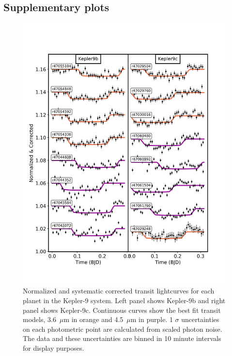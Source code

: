 \begin{subappendices}

\section{Supplementary plots}
\label{P4:app:plots}


\begin{figure}
  \includegraphics[trim={0 2cm 0 0},clip,width=\textwidth]{CorrectedLighctuvesPLDKepler9_circ_fixaincrp_new.pdf}
  \caption{Normalized and systematic corrected transit lightcurves for each planet in the Kepler-9 system. Left panel shows Kepler-9b and right panel shows Kepler-9c. Continuous curves show the best fit transit models, 3.6~$\mu$m in orange and 4.5~$\mu$m in purple. 1 $\sigma$ uncertainties on each photometric point are calculated from scaled photon noise. The data and these uncertainties are binned in 10 minute intervals for display purposes.}
  \label{P4:fig:normlcK9}
\end{figure}


\end{subappendices}
